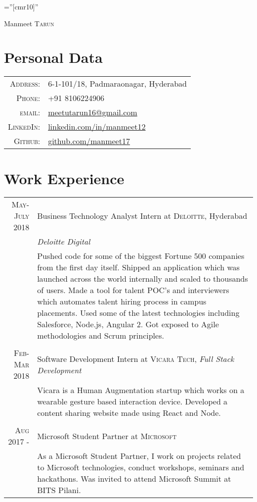 \documentclass[a4paper,10pt]{article}
\begin{document}
\pagestyle{empty} %

\font\fb=''[cmr10]'' %

\par{\centering
		{\Huge Manmeet \textsc{Tarun}
	}\bigskip\par}

\section{Personal Data}

\begin{tabular}{rl}
    \textsc{Address:}   & 6-1-101/18, Padmaraonagar, Hyderabad \\
    \textsc{Phone:}     & +91 8106224906\\
    \textsc{email:}     & \href{mailto:meetutarun16@gmail.com}{meetutarun16@gmail.com} \\
    \textsc{LinkedIn:} & \hyperlink{linkedin.com/in/manmeet12}{linkedin.com/in/manmeet12} \\
    \textsc{Github:} & \hyperlink{github.com/manmeet17}{github.com/manmeet17}
\end{tabular}

\section{Work Experience}
\begin{tabular}{r|p{11cm}}
 \textsc{May-July 2018} & Business Technology Analyst Intern at \textsc{Deloitte}, Hyderabad \\&\emph{Deloitte Digital}\\&\footnotesize{Pushed code for some of the biggest Fortune 500 companies from the first day itself. Shipped an application which was launched across the world internally and scaled to thousands of users. Made a tool for talent POC's and interviewers which automates talent hiring process in campus placements. Used some of the latest technologies including Salesforce, Node.js, Angular 2. Got exposed to Agile methodologies and Scrum principles.}\\\multicolumn{2}{c}{} \\
\textsc{Feb-Mar 2018} & Software Development Intern at \textsc{Vicara Tech}, \emph{Full Stack Development}\\&\footnotesize{Vicara is a Human Augmentation startup which works on a wearable gesture based interaction device. Developed a content sharing website made using React and Node.}\\\multicolumn{2}{c}{} \\
\textsc{Aug 2017 - } & Microsoft Student Partner at \textsc{Microsoft}\\&\footnotesize{As a Microsoft Student Partner, I work on projects related to Microsoft technologies, conduct workshops, seminars and hackathons. Was invited to attend Microsoft Summit at BITS Pilani.}
\end{tabular}
\end{document}
